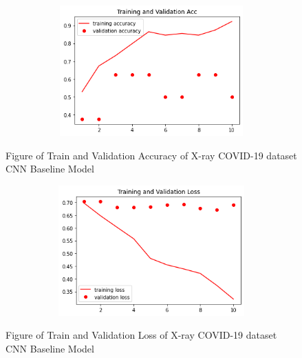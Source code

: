 \begin{table}[H]
    \centering
    \caption{X-ray COVID-19 dataset CNN baseline model results}
    \label{tab:X-ray COVID-19 dataset CNN baseline model results}
\end{table}
 \begin{figure}[H]
    \centering
    \includegraphics[width=1\textwidth,height=5cm,keepaspectratio]{Images/X-ray COVID-19 dataset CNN Train and Val Acc.png}\\
    \caption{Figure of Train and Validation Accuracy of X-ray COVID-19 dataset CNN Baseline Model}
    \label{fig:X-ray COVID-19 dataset CNN Baseline Train and Validation Accuracy}
\end{figure}
 \begin{figure}[H]
    \centering
    \includegraphics[width=1\textwidth,height=5cm,keepaspectratio]{Images/X-ray COVID-19 dataset CNN Train and Val Loss.png}\\
    \caption{Figure of Train and Validation Loss of X-ray COVID-19 dataset CNN Baseline Model}
    \label{fig:X-ray COVID-19 dataset CNN Baseline Train and Validation Loss}
\end{figure}

